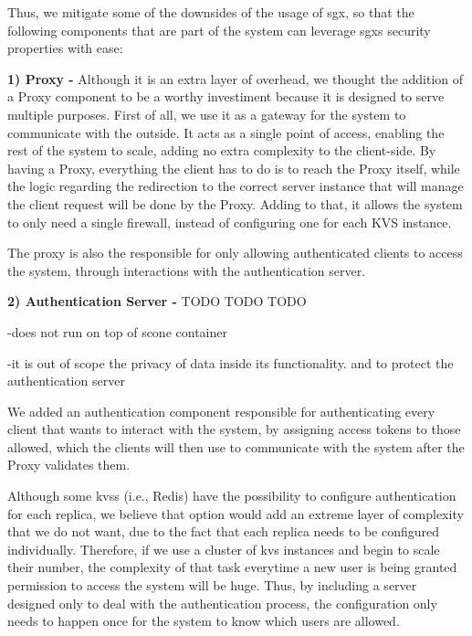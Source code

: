 Thus, we mitigate some of the downsides of the usage of \gls{sgx}, so that the following components that are part of the system can leverage \gls{sgx}s security properties with ease:

\vspace{5mm} 

\textbf{1) Proxy -}
Although it is an extra layer of overhead, we thought the addition of a Proxy component to be a worthy investiment because it is designed to serve multiple purposes. 
First of all, we use it as a gateway for the system to communicate with the outside. It acts as a single point of access, enabling the rest of the system to scale, adding no extra complexity to the client-side. By having a Proxy, everything the client has to do is to reach the Proxy itself, while the logic regarding the redirection to the correct server instance that will manage the client request will be done by the Proxy. Adding to that, it allows the system to only need a single firewall, instead of configuring one for each KVS instance.

The proxy is also the responsible for only allowing authenticated clients to access the system, through interactions with the authentication server. 

\vspace{5mm} 

\textbf{2) Authentication Server -} TODO TODO TODO

-does not run on top of scone container

-it is out of scope the privacy of data inside its functionality. and to protect the authentication server

We added an authentication component responsible for authenticating every client that wants to interact with the system, by assigning access tokens to those allowed, which the clients will then use to communicate with the system after the Proxy validates them.
 
Although some \gls{kvs}s (i.e., Redis) have the possibility to configure authentication for each replica, we believe that option would add an extreme layer of complexity that we do not want, due to the fact that each replica needs to be configured individually. Therefore, if we use a cluster of \gls{kvs} instances and begin to scale their number, the complexity of that task everytime a new user is being granted permission to access the system will be huge. Thus, by including a server designed only to deal with the authentication process, the configuration only needs to happen once for the system to know which users are allowed.

